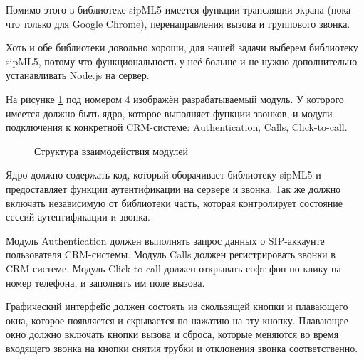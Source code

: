 Помимо этого в библиотеке sipML5 имеется функции трансляции экрана (пока что только для Google Chrome), перенаправления вызова и группового звонка.

Хоть и обе библиотеки довольно хороши, для нашей задачи выберем библиотеку sipML5, потому что функциональность у неё больше и не нужно дополнительно устанавливать Node.js на сервер.

На рисунке \ref{image:modulesStructure} под номером 4 изображён разрабатываемый модуль. У которого имеется должно быть ядро, которое выполняет функции звонков, и модули подключения к конкретной CRM-системе: Authentication, Calls, Click-to-call.

\begin{figure}[h!]
\caption{Структура взаимодействия модулей}
\label{image:modulesStructure}
\end{figure}

Ядро должно содержать код, который оборачивает библиотеку sipML5 и предоставляет функции аутентификации на сервере и звонка. Так же должно включать независимую от библиотеки часть, которая контролирует состояние сессий аутентификации и звонка.

Модуль Authentication должен выполнять запрос данных о SIP-аккаунте пользователя CRM-системы. Модуль Calls должен регистрировать звонки в CRM-системе. Модуль Click-to-call должен открывать софт-фон по клику на номер телефона, и заполнять им поле вызова.

Графический интерфейс должен состоять из скользящей кнопки и плавающего окна, которое появляется и скрывается по нажатию на эту кнопку. Плавающее окно должно включать кнопки вызова и сброса, которые меняются во время входящего звонка на кнопки снятия трубки и отклонения звонка соответственно.